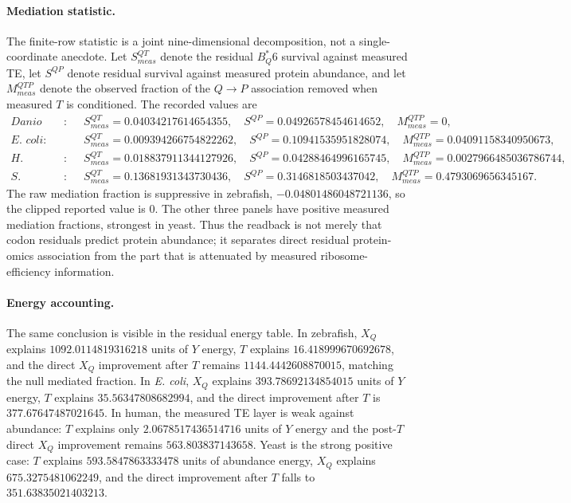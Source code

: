 \paragraph{Mediation statistic.}
The finite-row statistic is a joint nine-dimensional decomposition, not a single-coordinate anecdote. Let $S^{QT}_{meas}$ denote the residual $B^*_Q6$ survival against measured TE, let $S^{QP}$ denote residual survival against measured protein abundance, and let $M^{QTP}_{meas}$ denote the observed fraction of the $Q \to P$ association removed when measured $T$ is conditioned. The recorded values are
$$
\begin{aligned}
\textit{Danio rerio}:&\quad S^{QT}_{meas}=0.04034217614654355,\quad S^{QP}=0.04926578454614652,\quad M^{QTP}_{meas}=0,\\
\textit{E. coli}:&\quad S^{QT}_{meas}=0.009394266754822262,\quad S^{QP}=0.10941535951828074,\quad M^{QTP}_{meas}=0.04091158340950673,\\
\textit{H. sapiens}:&\quad S^{QT}_{meas}=0.018837911344127926,\quad S^{QP}=0.04288464996165745,\quad M^{QTP}_{meas}=0.0027966485036786744,\\
\textit{S. cerevisiae}:&\quad S^{QT}_{meas}=0.13681931343730436,\quad S^{QP}=0.3146818503437042,\quad M^{QTP}_{meas}=0.4793069656345167.
\end{aligned}
$$
The raw mediation fraction is suppressive in zebrafish, $-0.04801486048721136$, so the clipped reported value is $0$. The other three panels have positive measured mediation fractions, strongest in yeast. Thus the readback is not merely that codon residuals predict protein abundance; it separates direct residual protein-omics association from the part that is attenuated by measured ribosome-efficiency information.

\paragraph{Energy accounting.}
The same conclusion is visible in the residual energy table. In zebrafish, $X_Q$ explains $1092.0114819316218$ units of $Y$ energy, $T$ explains $16.418999670692678$, and the direct $X_Q$ improvement after $T$ remains $1144.4442608870015$, matching the null mediated fraction. In \emph{E. coli}, $X_Q$ explains $393.78692134854015$ units of $Y$ energy, $T$ explains $35.56347808682994$, and the direct improvement after $T$ is $377.67647487021645$. In human, the measured TE layer is weak against abundance: $T$ explains only $2.0678517436514716$ units of $Y$ energy and the post-$T$ direct $X_Q$ improvement remains $563.803837143658$. Yeast is the strong positive case: $T$ explains $593.5847863333478$ units of abundance energy, $X_Q$ explains $675.3275481062249$, and the direct improvement after $T$ falls to $351.63835021403213$.

